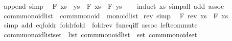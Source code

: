 \begin{isabellebody}
\endisatagproof
{\isafoldproof}%
%
\isadelimproof
\isanewline
%
\endisadelimproof
\isanewline
{}\isamarkupfalse%
\ append\ {\isacharbrackleft}{\kern0pt}simp{\isacharbrackright}{\kern0pt}{\isacharcolon}{\kern0pt}\isanewline
\ \ {\isachardoublequoteopen}F\ {\isacharparenleft}{\kern0pt}xs\ {\isacharat}{\kern0pt}\ ys{\isacharparenright}{\kern0pt}\ {\isacharequal}{\kern0pt}\ F\ xs\ \isactrlbold {\isacharasterisk}{\kern0pt}\ F\ ys{\isachardoublequoteclose}\isanewline
%
\isadelimproof
\ \ %
\endisadelimproof
%
\isatagproof
{}\isamarkupfalse%
\ {\isacharparenleft}{\kern0pt}induct\ xs{\isacharparenright}{\kern0pt}\ {\isacharparenleft}{\kern0pt}simp{\isacharunderscore}{\kern0pt}all\ add{\isacharcolon}{\kern0pt}\ assoc{\isacharparenright}{\kern0pt}%
\endisatagproof
{\isafoldproof}%
%
\isadelimproof
\isanewline
%
\endisadelimproof
\isanewline
{}\isamarkupfalse%
\isanewline
\isanewline
{}\isamarkupfalse%
\ comm{\isacharunderscore}{\kern0pt}monoid{\isacharunderscore}{\kern0pt}list\ {\isacharequal}{\kern0pt}\ comm{\isacharunderscore}{\kern0pt}monoid\ {\isacharplus}{\kern0pt}\ monoid{\isacharunderscore}{\kern0pt}list\isanewline
{}\isanewline
\isanewline
{}\isamarkupfalse%
\ rev\ {\isacharbrackleft}{\kern0pt}simp{\isacharbrackright}{\kern0pt}{\isacharcolon}{\kern0pt}\isanewline
\ \ {\isachardoublequoteopen}F\ {\isacharparenleft}{\kern0pt}rev\ xs{\isacharparenright}{\kern0pt}\ {\isacharequal}{\kern0pt}\ F\ xs{\isachardoublequoteclose}\isanewline
%
\isadelimproof
\ \ %
\endisadelimproof
%
\isatagproof
{}\isamarkupfalse%
\ {\isacharparenleft}{\kern0pt}simp\ add{\isacharcolon}{\kern0pt}\ eq{\isacharunderscore}{\kern0pt}foldr\ foldr{\isacharunderscore}{\kern0pt}fold\ \ fold{\isacharunderscore}{\kern0pt}rev\ fun{\isacharunderscore}{\kern0pt}eq{\isacharunderscore}{\kern0pt}iff\ assoc\ left{\isacharunderscore}{\kern0pt}commute{\isacharparenright}{\kern0pt}%
\endisatagproof
{\isafoldproof}%
%
\isadelimproof
\isanewline
%
\endisadelimproof
\isanewline
{}\isamarkupfalse%
\isanewline
\isanewline
{}\isamarkupfalse%
\ comm{\isacharunderscore}{\kern0pt}monoid{\isacharunderscore}{\kern0pt}list{\isacharunderscore}{\kern0pt}set\ {\isacharequal}{\kern0pt}\ list{\isacharcolon}{\kern0pt}\ comm{\isacharunderscore}{\kern0pt}monoid{\isacharunderscore}{\kern0pt}list\ {\isacharplus}{\kern0pt}\ set{\isacharcolon}{\kern0pt}\ comm{\isacharunderscore}{\kern0pt}monoid{\isacharunderscore}{\kern0pt}set\isanewline
{}\isanewline
\isanewline
{}\isamarkupfalse%

\end{isabellebody}
